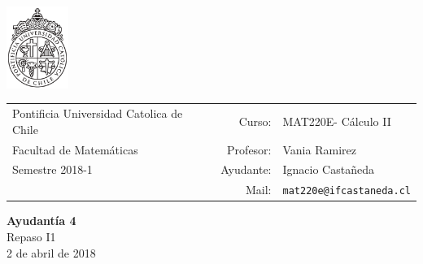 \documentclass[12pt]{article}
\makeatletter
\newcommand{\ayudantia}{{\sc Ayudantía 4}}
\newcommand{\tituloayu}{Repaso I1}
\newcommand{\fecha}{2 de abril de 2018}
\newcommand{\sigla}{MAT220E}
\newcommand{\nombre}{Cálculo II}
\newcommand{\profesor}{Vania Ramirez}
\newcommand{\ano}{2018}
\newcommand{\semestre}{1}
\newcommand{\mail}{mat220e@ifcastaneda.cl}
\makeatother
\begin{document}
\thispagestyle{empty}

\begin{minipage}{2cm}
	\includegraphics[width=2cm]{../../../../img/logo.pdf}
	\vspace{0.5cm}
\end{minipage}
\begin{minipage}{\linewidth}
	\begin{tabular}{lrl}
		{\scriptsize\sc Pontificia Universidad Catolica de Chile} & \hspace*{0.7in}Curso: &
		\sigla  - \nombre\\
		{\sc Facultad de Matemáticas}&
		Profesor: & \profesor \\
		{\sc Semestre \ano-\semestre} & Ayudante: & {Ignacio Castañeda}\\
		& {Mail:} & \texttt{\mail}
	\end{tabular}
\end{minipage}

\vspace{-10mm}
\begin{center}
	{\LARGE\bf \ayudantia}\\
	\vspace{0.1cm}
	{\tituloayu}\\
	\vspace{0.1cm}
	\fecha\\
	\vspace{0.4cm}
\end{center}
\end{document}
